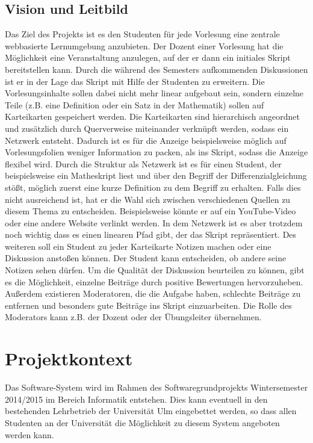 \documentclass[12pt,a4paper]{article}
\begin{document}
\newpage

\subsection{Vision und Leitbild}
Das Ziel des Projekts ist es den Studenten für jede Vorlesung eine zentrale webbasierte Lernumgebung anzubieten. Der Dozent einer Vorlesung hat die Möglichkeit eine Veranstaltung anzulegen, auf der er dann ein initiales Skript bereitstellen kann. Durch die während des Semesters aufkommenden Diskussionen ist er in der Lage das Skript mit Hilfe der Studenten zu erweitern. Die Vorlesungsinhalte sollen dabei nicht mehr linear aufgebaut sein, sondern einzelne Teile (z.B. eine Definition oder ein Satz in der Mathematik) sollen auf Karteikarten gespeichert werden. Die Karteikarten sind hierarchisch angeordnet und zusätzlich durch Querverweise miteinander verknüpft werden, sodass ein Netzwerk entsteht. Dadurch ist es für die Anzeige beispielsweise möglich auf Vorlesungsfolien weniger Information zu packen, als ins Skript, sodass die Anzeige flexibel wird. Durch die Struktur als Netzwerk ist es für einen Student, der beispielsweise ein Matheskript liest und über den Begriff der Differenzialgleichung stößt, möglich zuerst eine kurze Definition zu dem Begriff zu erhalten. Falls dies nicht ausreichend ist, hat er die Wahl sich zwischen verschiedenen Quellen zu diesem Thema zu entscheiden. Beispielsweise könnte er auf ein YouTube-Video oder eine andere Website verlinkt werden. In dem Netzwerk ist es aber trotzdem noch wichtig dass es einen linearen Pfad gibt, der das Skript repräsentiert. Des weiteren soll ein Student zu jeder Karteikarte Notizen machen oder eine Diskussion anstoßen können. Der Student kann entscheiden, ob andere seine Notizen sehen dürfen. Um die Qualität der Diskussion beurteilen zu können, gibt es die Möglichkeit, einzelne Beiträge durch positive Bewertungen hervorzuheben. Außerdem existieren Moderatoren, die die Aufgabe haben, schlechte Beiträge zu entfernen und besonders gute Beiträge ins Skript einzuarbeiten. Die Rolle des Moderators kann z.B. der Dozent oder der Übungsleiter übernehmen.


\section{Projektkontext}
Das Software-System wird im Rahmen des Softwaregrundprojekts Wintersemester 2014/2015 im Bereich Informatik entstehen. Dies kann eventuell in den bestehenden Lehrbetrieb der Universität Ulm eingebettet werden, so dass allen Studenten an der Universität die Möglichkeit zu diesem System angeboten werden kann.
\end{document}
